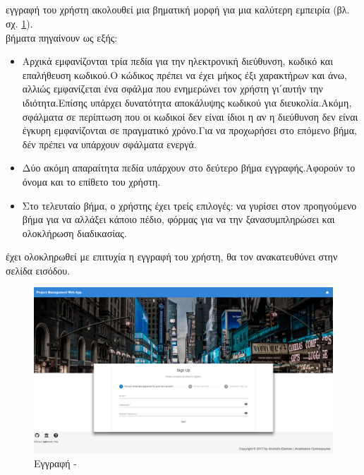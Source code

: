 \subsection*{}
 εγγραφή του χρήστη ακολουθεί μια βηματική μορφή για μια καλύτερη εμπειρία (βλ. σχ. \ref{fig:register}).\\
 βήματα πηγαίνουν ως εξής:\\
\begin{itemize}
	\item Αρχικά εμφανίζονται τρία πεδία για την ηλεκτρονική διεύθυνση, κωδικό και επαλήθευση κωδικού.Ο κώδικος πρέπει να έχει μήκος έξι χαρακτήρων και άνω, αλλιώς εμφανίζεται ένα σφάλμα που ενημερώνει τον χρήστη γι΄αυτήν την ιδιότητα.Επίσης υπάρχει δυνατότητα αποκάλυψης κωδικού για διευκολία.Ακόμη, σφάλματα σε περίπτωση που οι κωδικοί δεν είναι ίδιοι η αν η διεύθυνση δεν είναι έγκυρη εμφανίζονται σε πραγματικό χρόνο.Για να προχωρήσει στο επόμενο βήμα, δέν πρέπει να υπάρχουν σφάλματα ενεργά.
	\item Δύο ακόμη απαραίτητα πεδία υπάρχουν στο δεύτερο βήμα εγγραφής.Αφορούν το όνομα και το επίθετο του χρήστη.
	\item Στο τελευταίο βήμα, ο χρήστης έχει τρείς επιλογές: να γυρίσει στον προηγούμενο βήμα για να αλλάξει κάποιο πέδιο,  φόρμας για να την ξανασυμπληρώσει και ολοκλήρωση διαδικασίας.
\end{itemize}
 έχει ολοκληρωθεί με επιτυχία η εγγραφή του χρήστη, θα τον ανακατευθύνει στην σελίδα εισόδου.

\begin{figure}[!htb]
\centering
\includegraphics[scale=0.2]{images/register.png}
\caption{Εγγραφή - }
\label{fig:register}
\end{figure}

